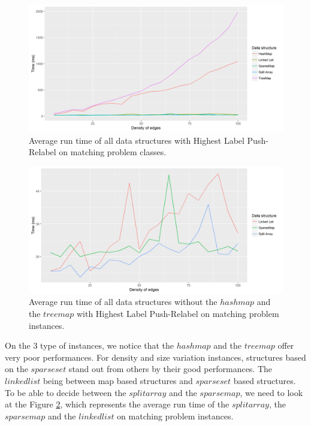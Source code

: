 \begin{figure}[H]
\begin{center}
\includegraphics[scale=0.6]{images/results/prmeanmatching.png}
\caption{Average run time of all data structures with Highest Label Push-Relabel on matching problem classes.}
\label{fig:prmeanmatching}
\end{center}
\end{figure}

\begin{figure}[H]
\begin{center}
\includegraphics[scale=0.55]{images/results/prmeanmatching2.png}
\caption{Average run time of all data structures without the $hashmap$ and the $treemap$ with Highest Label Push-Relabel on matching problem instances.}
\label{fig:prmeanmatching2}
\end{center}
\end{figure}
On the 3 type of instances, we notice that the $hashmap$ and the $treemap$ offer very poor performances. For density and size variation instances, structures based on the $sparse set$ stand out from others by their good performances. The $linked list$ being between map based structures and  $sparse set$ based structures. To be able to decide between the $split array$ and the $sparse map$, we need to look at the Figure \ref{fig:prmeanmatching2}, which represents the average run time of the $split array$, the $sparse map$ and the $linked list$ on matching problem instances.

